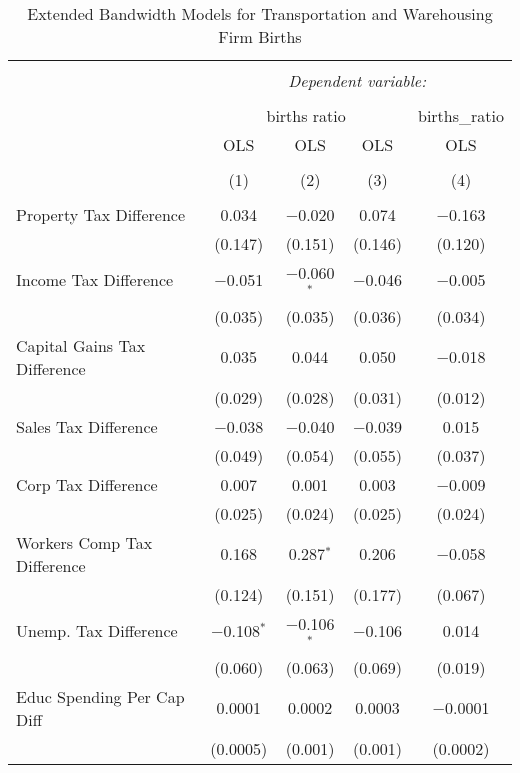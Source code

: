 
\begin{table}[!htbp] \centering 
  \caption{Extended Bandwidth Models for  Transportation and Warehousing Firm Births} 
  \label{48-49eb} 
\begin{tabular}{@{\extracolsep{5pt}}lcccc} 
\\[-1.8ex]\hline 
\hline \\[-1.8ex] 
 & \multicolumn{4}{c}{\textit{Dependent variable:}} \\ 
\cline{2-5} 
\\[-1.8ex] & \multicolumn{3}{c}{births ratio} & births\_ratio \\ 
 & OLS & OLS & OLS & OLS \\ 
\\[-1.8ex] & (1) & (2) & (3) & (4)\\ 
\hline \\[-1.8ex] 
 Property Tax Difference & 0.034 & $-$0.020 & 0.074 & $-$0.163 \\ 
  & (0.147) & (0.151) & (0.146) & (0.120) \\ 
  Income Tax Difference & $-$0.051 & $-$0.060$^{*}$ & $-$0.046 & $-$0.005 \\ 
  & (0.035) & (0.035) & (0.036) & (0.034) \\ 
  Capital Gains Tax Difference & 0.035 & 0.044 & 0.050 & $-$0.018 \\ 
  & (0.029) & (0.028) & (0.031) & (0.012) \\ 
  Sales Tax Difference & $-$0.038 & $-$0.040 & $-$0.039 & 0.015 \\ 
  & (0.049) & (0.054) & (0.055) & (0.037) \\ 
  Corp Tax Difference & 0.007 & 0.001 & 0.003 & $-$0.009 \\ 
  & (0.025) & (0.024) & (0.025) & (0.024) \\ 
  Workers Comp Tax Difference & 0.168 & 0.287$^{*}$ & 0.206 & $-$0.058 \\ 
  & (0.124) & (0.151) & (0.177) & (0.067) \\ 
  Unemp. Tax Difference & $-$0.108$^{*}$ & $-$0.106$^{*}$ & $-$0.106 & 0.014 \\ 
  & (0.060) & (0.063) & (0.069) & (0.019) \\ 
  Educ Spending Per Cap Diff & 0.0001 & 0.0002 & 0.0003 & $-$0.0001 \\ 
  & (0.0005) & (0.001) & (0.001) & (0.0002) \\ 

\end{tabular}
\end{table}
